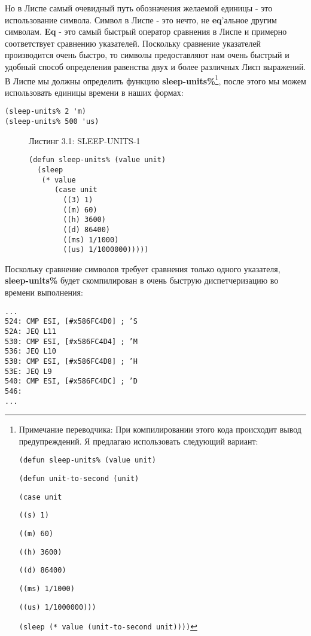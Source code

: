 Но в Лиспе самый очевидный путь обозначения желаемой единицы - это использование символа. Символ в Лиспе - это нечто, не \textbf{eq}'альное другим символам. \textbf{Eq} - это самый быстрый оператор сравнения в Лиспе и примерно соответствует сравнению указателей. Поскольку сравнение указателей производится очень быстро, то символы предоставляют нам очень быстрый и удобный способ определения равенства двух и более различных Лисп выражений. В Лиспе мы должны определить функцию \textbf{sleep-units\%}\footnote{Примечание переводчика: При компилировании этого кода происходит вывод предупреждений. Я предлагаю использовать следующий вариант:

\texttt{(defun sleep-units\% (value unit)}

\texttt{\quad(defun unit-to-second (unit)}

\texttt{\qquad(case unit}

\texttt{\qquad\quad((s) 1)}

\texttt{\qquad\quad((m) 60)}

\texttt{\qquad\quad((h) 3600)}

\texttt{\qquad\quad((d) 86400)}

\texttt{\qquad\quad((ms) 1/1000)}

\texttt{\qquad\quad((us) 1/1000000)))}

\texttt{\quad(sleep (* value (unit-to-second unit))))}

}, после этого мы можем использовать единицы времени в наших формах:

\begin{verbatim}
(sleep-units% 2 'm)
(sleep-units% 500 'us)
\end{verbatim}

\begin{figure}Листинг 3.1: SLEEP-UNITS-1\label{listing_3.1}
\listbegin
\begin{verbatim}
(defun sleep-units% (value unit)
  (sleep
   (* value
      (case unit
        ((3) 1)
        ((m) 60)
        ((h) 3600)
        ((d) 86400)
        ((ms) 1/1000)
        ((us) 1/1000000)))))
\end{verbatim}
\listend
\end{figure}


Поскольку сравнение символов требует сравнения только одного указателя, \textbf{sleep-units\%} будет скомпилирован в очень быструю диспетчеризацию во времени выполнения:

\begin{verbatim}
...
524: CMP ESI, [#x586FC4D0] ; ’S
52A: JEQ L11
530: CMP ESI, [#x586FC4D4] ; ’M
536: JEQ L10
538: CMP ESI, [#x586FC4D8] ; ’H
53E: JEQ L9
540: CMP ESI, [#x586FC4DC] ; ’D
546:
...
\end{verbatim}

